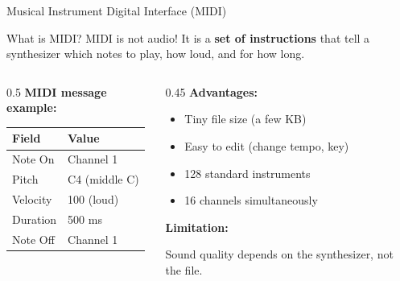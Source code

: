 \documentclass[aspectratio=169,12pt]{beamer}
\begin{document}
\begin{frame}{Musical Instrument Digital Interface (MIDI)}
    \begin{block}{What is MIDI?}
        MIDI is not audio! It is a \textbf{set of instructions} that tell a synthesizer which notes to play, how loud, and for how long.
    \end{block}
    
    \vspace{0.3cm}
    \begin{columns}
        \begin{column}{0.5\textwidth}
            \textbf{MIDI message example:}
            \begin{center}
                \begin{tabular}{l|l}
                    \toprule
                    Field & Value \\
                    \midrule
                    Note On & Channel 1 \\
                    Pitch & C4 (middle C) \\
                    Velocity & 100 (loud) \\
                    Duration & 500 ms \\
                    Note Off & Channel 1 \\
                    \bottomrule
                \end{tabular}
            \end{center}
        \end{column}
        \begin{column}{0.45\textwidth}
            \textbf{Advantages:}
            \begin{itemize}
                \item Tiny file size (a few KB)
                \item Easy to edit (change tempo, key)
                \item 128 standard instruments
                \item 16 channels simultaneously
            \end{itemize}
            
            \vspace{0.2cm}
            \textbf{Limitation:}
            
            Sound quality depends on the synthesizer, not the file.
        \end{column}
    \end{columns}
\end{frame}
\end{document}
